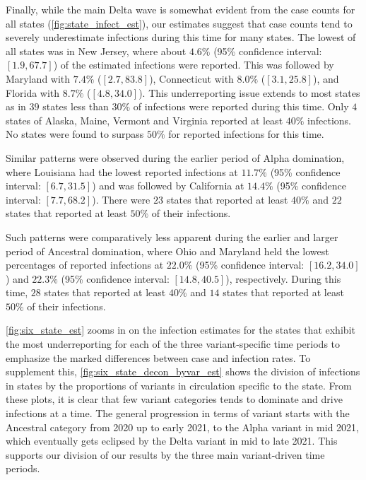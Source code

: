 \documentclass{article}
\begin{document}
Finally, while the main Delta wave is somewhat evident from the case counts for all states 
(\autoref{fig:state_infect_est}), our estimates suggest that case counts tend to severely 
underestimate infections during this time for many states. The lowest of all states was in New Jersey,
where about $4.6\%$ (95\% confidence interval: $[1.9, 67.7]$) of the estimated infections were reported.
This was followed by Maryland with $7.4\%$ ($[2.7, 83.8]$), Connecticut
with $8.0\%$ ($[3.1, 25.8]$), and Florida with $8.7\%$ ($[4.8, 34.0]$). This underreporting issue extends to most states as in $39$ states less than $30\%$ of infections were reported during this time. Only $4$ states of Alaska, Maine, Vermont and Virginia reported at least $40\%$ infections. No states were found to surpass $50\%$ for reported infections for this time.

Similar patterns were observed during the earlier period of Alpha domination, where Louisiana had the lowest reported infections at 
$11.7\%$ (95\% confidence interval: $[6.7, 31.5]$) and was followed by California at $14.4\%$ (95\% confidence interval: $[7.7, 68.2]$). There were $23$ states that reported at least $40\%$ and $22$ states that reported at least $50\%$ of their infections.

Such patterns were comparatively less apparent during the earlier and larger period of Ancestral domination, where Ohio and Maryland held the lowest percentages of reported infections at $22.0\%$ (95\% confidence interval: $[16.2, 34.0]$) and $22.3\%$ (95\% confidence interval: $[14.8, 40.5]$), respectively. During this time, $28$ states that reported at least $40\%$ and $14$ states that reported at least $50\%$ of their infections. 

\autoref{fig:six_state_est} zooms in on the infection estimates for the states that exhibit the most underreporting for each of the three variant-specific time periods to emphasize the marked differences between case and infection rates. To supplement this, \autoref{fig:six_state_decon_byvar_est} shows the division of infections in states by the proportions of variants in circulation specific to the state. 
From these plots, it is clear that few variant categories tends to dominate and drive infections at a time. The general progression in terms of variant starts with the Ancestral category from 2020 up to early 2021, to the Alpha variant in mid 2021, which eventually gets eclipsed by the Delta variant in mid to late 2021. This supports our division of our results by the three main variant-driven time periods.
\end{document}
